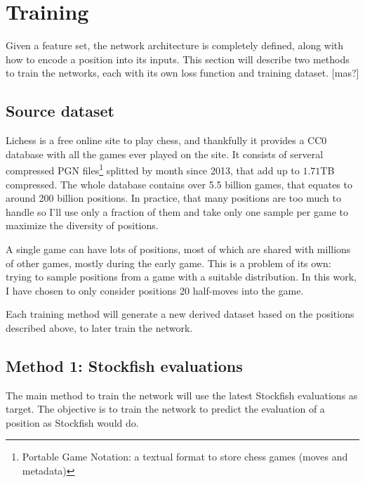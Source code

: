 \section{Training}


Given a feature set, the network architecture is completely defined, along with how to encode a position into its inputs. This section will describe two methods to train the networks, each with its own loss function and training dataset.
[mas?]

\subsection{Source dataset}

Lichess is a free online site to play chess, and thankfully it provides a CC0 database \cite{lichessdb} with all the games ever played on the site. It consists of serveral compressed PGN files\footnote{Portable Game Notation: a textual format to store chess games (moves and metadata)} splitted by month since 2013, that add up to $1.71$TB compressed. The whole database contains over 5.5 billion games, that equates to around 200 billion positions. In practice, that many positions are too much to handle so I'll use only a fraction of them and take only one sample per game to maximize the diversity of positions.


A single game can have lots of positions, most of which are shared with millions of other
games, mostly during the early game. This is a problem of its own: trying to sample positions from a game with a suitable distribution. In this work, I have chosen to only consider positions 20 half-moves into the game.

Each training method will generate a new derived dataset based on the positions described above, to later train the network.

\subsection{Method 1: Stockfish evaluations}

The main method to train the network will use the latest Stockfish evaluations as target. The objective is to train the network to predict the evaluation of a position as Stockfish would do.

